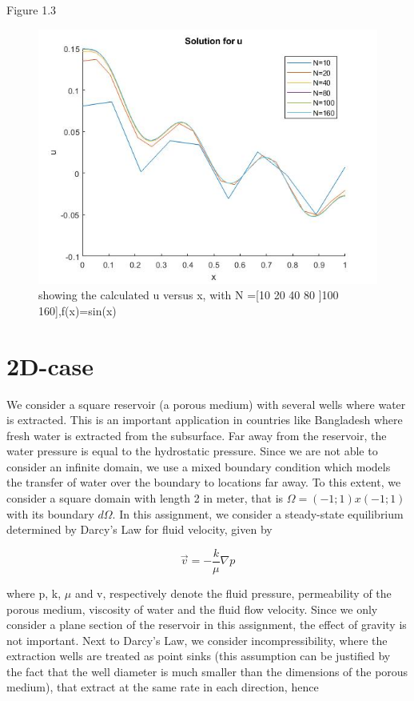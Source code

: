 \documentclass{report}
\begin{document}
Figure 1.3

\begin{figure}[ht!]
	\centering
	\includegraphics[width=150mm]{1Dfsinx.jpg}
	\caption{showing the calculated u versus x, with N =[10 20 40 80 ]100 160],f(x)=sin(x) \label{overflow}}
\end{figure}


\chapter{2D-case}

We consider a square reservoir (a porous medium) with several wells where water is extracted. This is an important application in countries like Bangladesh where fresh water is extracted from the subsurface. Far away from the reservoir, the water pressure is equal to the hydrostatic pressure. Since we are not able to consider an infinite domain, we use a mixed boundary condition which models the transfer of water over the boundary to locations far away. To this extent, we consider a square domain with length 2 in meter, that is $\Omega= (-1; 1) x (-1; 1)$ with its boundary $d\Omega$. In this assignment, we consider a steady-state equilibrium determined by Darcy's Law for fluid velocity, given by

\begin{equation}
\vec{v}=-\frac{k}{\mu}\nabla p
\end{equation}
\medskip

where p, k, $\mu$ and v, respectively denote the 
fluid pressure, permeability of the porous medium, viscosity of water and the fluid flow velocity. Since we only consider a plane section of the reservoir in this assignment, the effect of gravity is not important. Next to Darcy's Law, we consider incompressibility, where
the extraction wells are treated as point sinks (this assumption can be justified by the fact that the well diameter is much smaller than the dimensions of the
porous medium), that extract at the same rate in each direction, hence
\end{document}
